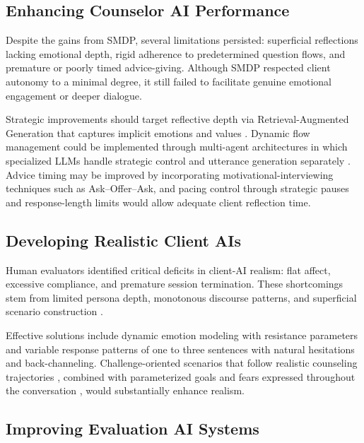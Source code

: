 \documentclass{wiley-article}
\begin{document}
\subsection*{Enhancing Counselor AI Performance}

Despite the gains from SMDP, several limitations persisted: superficial reflections lacking emotional depth, rigid adherence to predetermined question flows, and premature or poorly timed advice-giving. Although SMDP respected client autonomy to a minimal degree, it still failed to facilitate genuine emotional engagement or deeper dialogue.

Strategic improvements should target reflective depth via Retrieval-Augmented Generation that captures implicit emotions and values \citep{arabiHabitCoachCustomising2024}. Dynamic flow management could be implemented through multi-agent architectures in which specialized LLMs handle strategic control and utterance generation separately \citep{xuAutoCBTAutonomousMultiagent2025, kampmanMultiAgentDualDialogue2024}. Advice timing may be improved by incorporating motivational-interviewing techniques such as Ask–Offer–Ask, and pacing control through strategic pauses and response-length limits would allow adequate client reflection time.

\subsection*{Developing Realistic Client AIs}

Human evaluators identified critical deficits in client-AI realism: flat affect, excessive compliance, and premature session termination. These shortcomings stem from limited persona depth, monotonous discourse patterns, and superficial scenario construction \citep{mauryaQualitativeContentAnalysis2024, qiuInteractiveAgentsSimulating2024}.

Effective solutions include dynamic emotion modeling with resistance parameters \citep{baoSFMSSServiceFlow2025} and variable response patterns of one to three sentences with natural hesitations and back-channeling. Challenge-oriented scenarios that follow realistic counseling trajectories \citep{duLLMsCanSimulate2024}, combined with parameterized goals and fears expressed throughout the conversation \citep{cookVirtualPatientsUsing2025}, would substantially enhance realism.

\subsection*{Improving Evaluation AI Systems}
\end{document}
